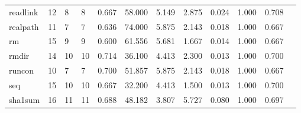 \begin{longtable}{lp{1.00cm}p{1.00cm}p{1.00cm}p{1.00cm}p{1.00cm}p{1.00cm}p{1.00cm}p{1.00cm}p{1.00cm}p{1.00cm}p{1.00cm}}
readlink  &                           12 &                  8 &                                 8 &                                      0.667 &                                 58.000 &                                        5.149 &                             2.875 &                                   0.024 &                        1.000 &                                        0.708 \\
realpath  &                           11 &                  7 &                                 7 &                                      0.636 &                                 74.000 &                                        5.875 &                             2.143 &                                   0.018 &                        1.000 &                                        0.667 \\
rm        &                           15 &                  9 &                                 9 &                                      0.600 &                                 61.556 &                                        5.681 &                             1.667 &                                   0.014 &                        1.000 &                                        0.667 \\
rmdir     &                           14 &                 10 &                                10 &                                      0.714 &                                 36.100 &                                        4.413 &                             2.300 &                                   0.013 &                        1.000 &                                        0.700 \\
runcon    &                           10 &                  7 &                                 7 &                                      0.700 &                                 51.857 &                                        5.875 &                             2.143 &                                   0.018 &                        1.000 &                                        0.667 \\
seq       &                           15 &                 10 &                                10 &                                      0.667 &                                 32.200 &                                        4.413 &                             1.500 &                                   0.013 &                        1.000 &                                        0.700 \\
sha1sum   &                           16 &                 11 &                                11 &                                      0.688 &                                 48.182 &                                        3.807 &                             5.727 &                                   0.080 &                        1.000 &                                        0.697 \\

\end{longtable}
